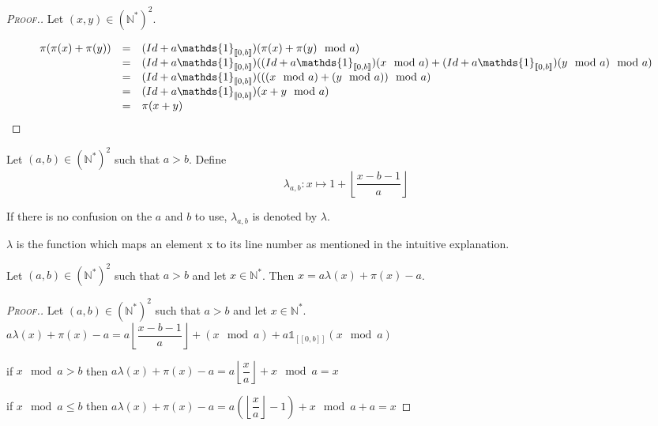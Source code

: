 \begin{proof}[\textsc{Proof.}]
Let \((x,y)\in (\mathbb{N}^*)^2\).

\[
\begin{array}{c c l}
	\pi(\pi(x)+\pi(y)) & = & (Id+a\mathds{1}_{ [\![0,b]\!]})(\pi(x)+\pi(y) \mod a)\\
	& = & (Id+a\mathds{1}_{ [\![0,b]\!]})((Id+a\mathds{1}_{ [\![0,b]\!]})(x \mod a)+(Id+a\mathds{1}_{ [\![0,b]\!]})(y \mod a) \mod a) \\
	& = & (Id+a\mathds{1}_{ [\![0,b]\!]})(((x \mod a) + (y \mod a)) \mod a)\\
	& = & (Id+a\mathds{1}_{ [\![0,b]\!]})( x+y \mod a)\\
	& = & \pi(x+y)
\end{array}
\]
\end{proof}


\begin{definition}

Let \((a,b) \in (\mathbb{N}^*)^2\) such that \(a>b\). Define
\[ \lambda_{a,b}:x \longmapsto 1+ \left\lfloor\dfrac{x-b-1}{a}\right\rfloor\]
\end{definition}

If there is no confusion on the \(a\) and \(b\) to use, \(\lambda_{a, b}\) is denoted by \(\lambda\).

\(\lambda\) is the function which maps an element x to its line number as mentioned in the intuitive explanation.

\begin{proposition}
Let \((a,b)\in (\mathbb{N}^*)^2\) such that \(a>b\) and let \(x\in \mathbb{N}^*\). Then \(x=a\lambda(x)+\pi(x)-a\).
\end{proposition}

\begin{proof}[\textsc{Proof.}]
Let \((a,b)\in (\mathbb{N}^*)^2\) such that \(a>b\) and let \(x\in \mathbb{N}^*\). \\
\(a\lambda(x)+\pi(x)-a=a\left\lfloor\dfrac{x-b-1}{a}\right\rfloor+(x \mod a)+ a \mathds{1}_{ [\![0,b]\!]}(x \mod a)\)

\noindent  if \(x \mod a>b\) then \(a\lambda(x)+\pi(x)-a=a\left\lfloor\dfrac{x}{a}\right\rfloor+x \mod a=x\)

\noindent if \(x \mod a \leqslant b\) then
\(a\lambda(x)+\pi(x)-a=a \left( \left \lfloor \dfrac{x}{a} \right \rfloor - 1 \right)+x \mod a +a=x\)
\end{proof}


